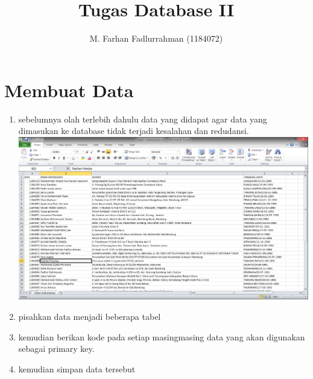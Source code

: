 \documentclass[12pt]{article}
\begin{document}
\title{Tugas Database II}
\author{M. Farhan Fadlurrahman (1184072)}
\date{}
\maketitle

\section*{Membuat Data}
	\begin{enumerate}
		\item sebelumnya olah terlebih dahulu data yang didapat agar data yang dimasukan ke database tidak terjadi kesalahan dan redudansi.\\
		\includegraphics[scale=0.3]{src/21}
		
		\item pisahkan data menjadi beberapa tabel
		\item kemudian berikan kode pada setiap masingmasing data yang akan digunakan sebagai primary key.
		\item kemudian simpan data tersebut
	\end{enumerate}
\end{document}
